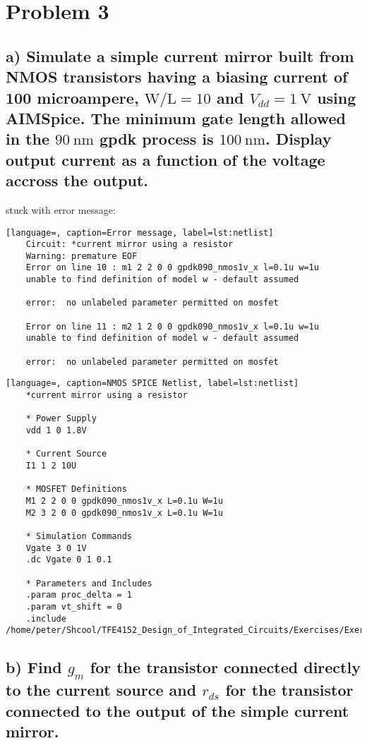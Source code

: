 \section{Problem 3}

\subsection*{a) Simulate a simple current mirror built from NMOS transistors having a biasing current of 100 microampere, $\mathrm{W} / \mathrm{L}=10$ and $V_{d d}=1 \mathrm{~V}$ using AIMSpice. The minimum gate length allowed in the $90 \mathrm{~nm}$ gpdk process is $100 \mathrm{~nm}$. Display output current as a function of the voltage accross the output.}

stuck with error message:
\begin{lstlisting}[language=, caption=Error message, label=lst:netlist]
    Circuit: *current mirror using a resistor
    Warning: premature EOF
    Error on line 10 : m1 2 2 0 0 gpdk090_nmos1v_x l=0.1u w=1u
    unable to find definition of model w - default assumed 

    error:  no unlabeled parameter permitted on mosfet

    Error on line 11 : m2 1 2 0 0 gpdk090_nmos1v_x l=0.1u w=1u
    unable to find definition of model w - default assumed 

    error:  no unlabeled parameter permitted on mosfet
\end{lstlisting}

\begin{lstlisting}[language=, caption=NMOS SPICE Netlist, label=lst:netlist]
    *current mirror using a resistor

    * Power Supply
    vdd 1 0 1.8V

    * Current Source
    I1 1 2 10U

    * MOSFET Definitions
    M1 2 2 0 0 gpdk090_nmos1v_x L=0.1u W=1u
    M2 3 2 0 0 gpdk090_nmos1v_x L=0.1u W=1u

    * Simulation Commands
    Vgate 3 0 1V
    .dc Vgate 0 1 0.1

    * Parameters and Includes
    .param proc_delta = 1
    .param vt_shift = 0
    .include /home/peter/Shcool/TFE4152_Design_of_Integrated_Circuits/Exercises/Exercise_3/AimSpice/gpdk90nm_tt.inc
\end{lstlisting}

\subsection*{b) Find $g_m$ for the transistor connected directly to the current source and $r_{d s}$ for the transistor connected to the output of the simple current mirror.}



